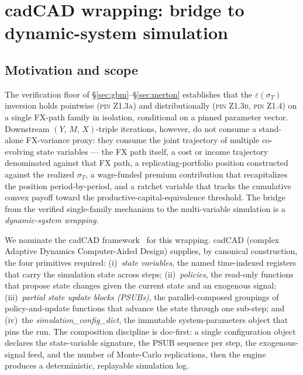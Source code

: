 \documentclass[11pt,letterpaper]{article}
\newcommand{\sigmaT}{\sigma_{T}}
\newcommand{\epsT}{\varepsilon(\sigmaT)}
\newcommand{\Ymx}{(Y,\,M,\,X)}
\newcommand{\PinZ}[1]{\textsc{pin Z1.#1}}
\begin{document}
\section{cadCAD wrapping: bridge to dynamic-system simulation}
\label{sec:cadcad}

\subsection{Motivation and scope}
\label{sec:cadcad:motivation}

The verification floor of \S\ref{sec:gbm}--\S\ref{sec:merton} establishes
that the $\epsT$ inversion holds pointwise (\PinZ{3a}) and
distributionally (\PinZ{3b}, \PinZ{4}) on a single FX-path family in
isolation, conditional on a pinned parameter vector. Downstream
\(\Ymx\)-triple iterations, however, do not consume a stand-alone
FX-variance proxy: they consume the joint trajectory of multiple
co-evolving state variables — the FX path itself, a cost or income
trajectory denominated against that FX path, a replicating-portfolio
position constructed against the realized $\sigmaT$, a wage-funded
premium contribution that recapitalizes the position period-by-period,
and a ratchet variable that tracks the cumulative convex payoff toward
the productive-capital-equivalence threshold. The bridge from the
verified single-family mechanism to the multi-variable simulation is a
\emph{dynamic-system wrapping}.

We nominate the cadCAD framework~\cite{cadcad} for this wrapping. cadCAD
(complex Adaptive Dynamics Computer-Aided Design) supplies, by canonical
construction, the four primitives required: (i)~\emph{state variables},
the named time-indexed registers that carry the simulation state across
steps; (ii)~\emph{policies}, the read-only functions that propose state
changes given the current state and an exogenous signal; (iii)~\emph{partial
state update blocks (PSUBs)}, the parallel-composed groupings of
policy-and-update functions that advance the state through one
sub-step; and (iv)~the \emph{simulation\_config\_dict},
the immutable system-parameters object that pins the run.
The composition discipline is doc-first: a single configuration object
declares the state-variable signature, the PSUB sequence per step, the
exogenous-signal feed, and the number of Monte-Carlo replications, then
the engine produces a deterministic, replayable simulation log.
\end{document}

